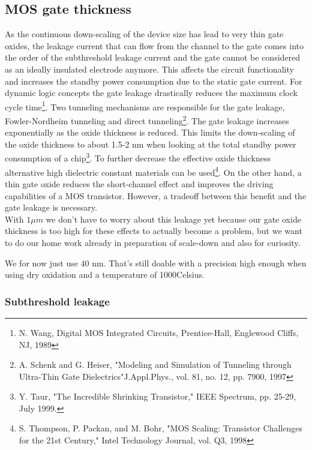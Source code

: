 \subsection{MOS gate thickness}\label{gate_dimensioning}
As the continuous down-scaling of the device size has lead to very thin gate oxides, the leakage current that can flow from the channel to the gate comes into the order of the subthreshold leakage current and the gate cannot be considered as an ideally insulated electrode anymore.
This affects the circuit functionality and increases the standby power consumption due to the static gate current.
For dynamic logic concepts the gate leakage drastically reduces the maximum clock cycle time\footnote{N. Wang, Digital MOS Integrated Circuits, Prentice-Hall, Englewood Cliffs, NJ, 1989}.
Two tunneling mechanisms are responsible for the gate leakage, Fowler-Nordheim tunneling and direct tunneling\footnote{A. Schenk and G. Heiser, "Modeling and Simulation of Tunneling through Ultra-Thin Gate Dielectrics"J.Appl.Phys., vol. 81, no. 12, pp. 7900, 1997}.
The gate leakage increases exponentially as the oxide thickness is reduced.
This limits the down-scaling of the oxide thickness to about 1.5-2 nm when looking at the total standby power consumption of a chip\footnote{Y. Taur, "The Incredible Shrinking Transistor," IEEE Spectrum, pp. 25-29, July 1999.}.
To further decrease the effective oxide thickness alternative high dielectric constant materials can be used\footnote{S. Thompson, P. Packan, and M. Bohr, "MOS Scaling: Transistor Challenges for the 21st Century," Intel Technology Journal, vol. Q3, 1998}.
On the other hand, a thin gate oxide reduces the short-channel effect and improves the driving capabilities of a MOS transistor.
However, a tradeoff between this benefit and the gate leakage is necessary.\\

With $1 \mu m$ we don't have to worry about this leakage yet because our gate oxide thickness is too high for these effects to actually become a problem, but we want to do our home work already in preparation of scale-down and also for curiosity.

We for now just use 40 nm. That's still doable with a precision high enough when using dry oxidation and a temperature of 1000\degree Celsius.

\subsubsection{Subthreshold leakage}\label{sub_threshold_leakage}

